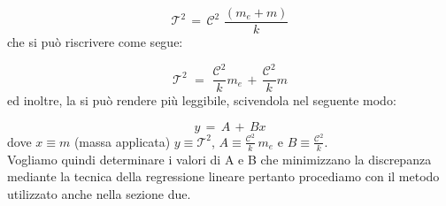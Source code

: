 \begin{equation*}
	\mathcal{T}^2 \,=\, \mathcal{C}^2 \,\, \frac{(m_e + m)}{k}
\end{equation*}
%
che si può riscrivere come segue:

\begin{equation}
	\mathcal{T}^2 \,\,=\,\, \frac{\mathcal{C}^2}{k} m_e \,+\, \frac{\mathcal{C}^2}{k} m
	\label{eq:mCspezzati}
\end{equation}
%
ed inoltre, la si può rendere più leggibile, scivendola nel seguente modo:

\begin{equation}
	y \,=\, A \,+\, Bx
	\label{eq:pppar}
\end{equation}
%
dove $x \equiv m$ (massa applicata) $y \equiv \mathcal{T}^2$, $A \equiv \frac{\mathcal{C}^2}{k} \, m_e$ e $B \equiv \frac{\mathcal{C}^2}{k}$.\\
Vogliamo quindi determinare i valori di A e B che minimizzano la discrepanza mediante la tecnica della regressione lineare pertanto procediamo con il metodo utilizzato anche nella sezione due.
